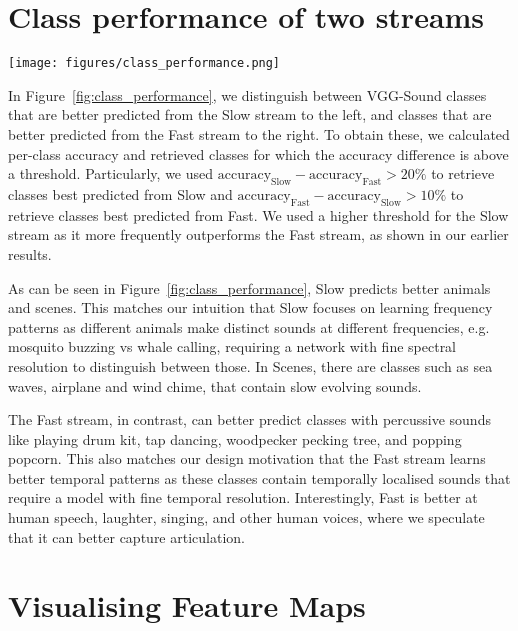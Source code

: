 \documentclass{article}
\begin{document}
\section{Class performance of two streams}
\label{sec:class-level}

\begin{figure*}[t!]
    \centering
    \texttt{[image: figures/class\_performance.png]}
    \caption{Classes from VGG-Sound that are better predicted from Slow (left) versus Fast (right) streams.}
\label{fig:class_performance}
\end{figure*}

In Figure~\ref{fig:class_performance}, we distinguish between VGG-Sound classes that are better predicted from the Slow stream to the left, and classes that are better predicted from the Fast stream to the right. To obtain these, we calculated per-class accuracy and retrieved classes for which the accuracy difference is above a threshold. Particularly, we used $\text{accuracy}_\text{Slow}-\text{accuracy}_\text{Fast}>20\%$ to retrieve classes best predicted from Slow and $\text{accuracy}_\text{Fast}-\text{accuracy}_\text{Slow}>10\%$ to retrieve classes best predicted from Fast. We used a higher threshold for the Slow stream as it more frequently outperforms the Fast stream, as shown in our earlier results. 

As can be seen in Figure~\ref{fig:class_performance}, Slow predicts better animals and scenes. This matches our intuition that Slow focuses on learning frequency patterns as different animals make distinct sounds at different frequencies, e.g. mosquito buzzing vs whale calling, requiring a network with fine spectral resolution to distinguish between those. In Scenes, there are classes such as sea waves, airplane and wind chime, that contain slow evolving sounds. 

The Fast stream, in contrast, can better predict classes with percussive sounds like playing drum kit, tap dancing, woodpecker pecking tree, and popping popcorn. This also matches our design motivation that the Fast stream learns better temporal patterns as these classes contain temporally localised sounds that require a model with fine temporal resolution.
Interestingly, Fast is better at human speech, laughter, singing, and other human voices, where we speculate that it can better capture articulation.

\section{Visualising Feature Maps}
\label{sec:features}
\end{document}
